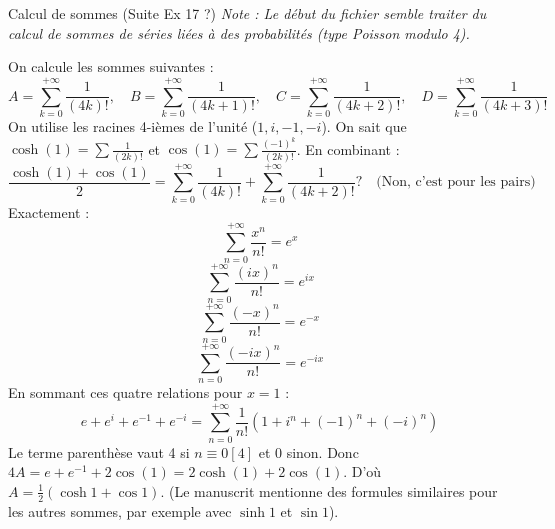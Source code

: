 \begin{correction}{Calcul de sommes (Suite Ex 17 ?)}
\textit{Note : Le début du fichier semble traiter du calcul de sommes de séries liées à des probabilités (type Poisson modulo 4).}

On calcule les sommes suivantes :
$$ A = \sum_{k=0}^{+ \infty} \frac{1}{(4k)!}, \quad B = \sum_{k=0}^{+ \infty} \frac{1}{(4k+1)!}, \quad C = \sum_{k=0}^{+ \infty} \frac{1}{(4k+2)!}, \quad D = \sum_{k=0}^{+ \infty} \frac{1}{(4k+3)!} $$
On utilise les racines 4-ièmes de l'unité ($1, i, -1, -i$).
On sait que $\cosh(1) = \sum \frac{1}{(2k)!}$ et $\cos(1) = \sum \frac{(-1)^k}{(2k)!}$.
En combinant :
$$ \frac{\cosh(1) + \cos(1)}{2} = \sum_{k=0}^{+ \infty} \frac{1}{(4k)!} + \sum_{k=0}^{+ \infty} \frac{1}{(4k+2)!}? \quad \text{(Non, c'est pour les pairs)} $$
Exactement :
$$ \sum_{n=0}^{+ \infty} \frac{x^n}{n!} = e^x $$
$$ \sum_{n=0}^{+ \infty} \frac{(ix)^n}{n!} = e^{ix} $$
$$ \sum_{n=0}^{+ \infty} \frac{(-x)^n}{n!} = e^{-x} $$
$$ \sum_{n=0}^{+ \infty} \frac{(-ix)^n}{n!} = e^{-ix} $$
En sommant ces quatre relations pour $x=1$ :
$$ e + e^i + e^{-1} + e^{-i} = \sum_{n=0}^{+ \infty} \frac{1}{n!} (1 + i^n + (-1)^n + (-i)^n) $$
Le terme parenthèse vaut 4 si $n \equiv 0 [4]$ et 0 sinon.
Donc $4A = e + e^{-1} + 2\cos(1) = 2\cosh(1) + 2\cos(1)$.
D'où $A = \frac{1}{2}(\cosh 1 + \cos 1)$.
(Le manuscrit mentionne des formules similaires pour les autres sommes, par exemple avec $\sinh 1$ et $\sin 1$).
\end{correction}

